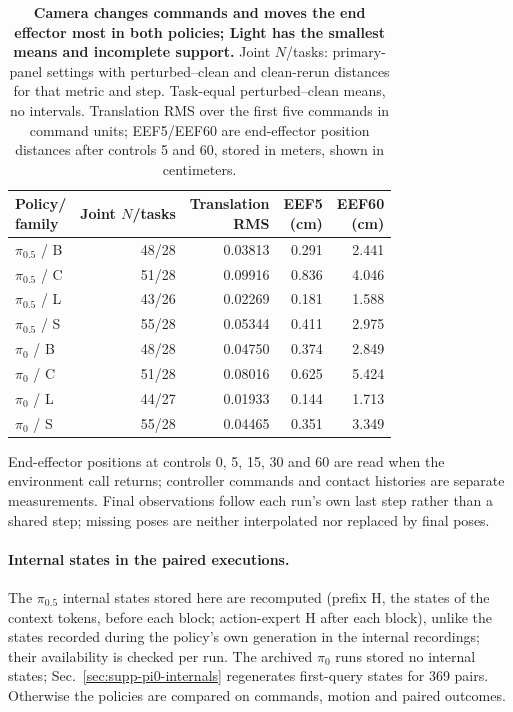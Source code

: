 \begin{table}[t]
\caption{\textbf{Camera changes commands and moves the end effector most in both policies; Light has the smallest means and incomplete support.} Joint $N$/tasks: primary-panel settings with perturbed--clean and clean-rerun distances for that metric and step. Task-equal perturbed--clean means, no intervals. Translation RMS over the first five commands in command units; EEF5/EEF60 are end-effector position distances after controls 5 and 60, stored in meters, shown in centimeters.}

\centering\small
\setlength{\tabcolsep}{4pt}
\begin{tabular}{lrrrr}
\toprule
\shortstack{Policy/\\family} & \shortstack{Joint\\$N$/tasks} & \shortstack{Translation\\RMS} & \shortstack{EEF5\\(cm)} & \shortstack{EEF60\\(cm)}\\
\midrule
$\pi_{0.5}$ / B & 48/28 & 0.03813 & 0.291 & 2.441\\
$\pi_{0.5}$ / C & 51/28 & 0.09916 & 0.836 & 4.046\\
$\pi_{0.5}$ / L & 43/26 & 0.02269 & 0.181 & 1.588\\
$\pi_{0.5}$ / S & 55/28 & 0.05344 & 0.411 & 2.975\\
$\pi_0$ / B & 48/28 & 0.04750 & 0.374 & 2.849\\
$\pi_0$ / C & 51/28 & 0.08016 & 0.625 & 5.424\\
$\pi_0$ / L & 44/27 & 0.01933 & 0.144 & 1.713\\
$\pi_0$ / S & 55/28 & 0.04465 & 0.351 & 3.349\\
\bottomrule
\end{tabular}

\label{tab:five-arm-motion}
\end{table}

End-effector positions at controls 0, 5, 15, 30 and 60 are read when the environment call returns; controller commands and contact histories are separate measurements. Final observations follow each run's own last step rather than a shared step; missing poses are neither interpolated nor replaced by final poses.

\paragraph{Internal states in the paired executions.}
The $\pi_{0.5}$ internal states stored here are recomputed (prefix H, the states of the context tokens, before each block; action-expert H after each block), unlike the states recorded during the policy's own generation in the internal recordings; their availability is checked per run. The archived $\pi_0$ runs stored no internal states; Sec.~\ref{sec:supp-pi0-internals} regenerates first-query states for 369 pairs. Otherwise the policies are compared on commands, motion and paired outcomes.

